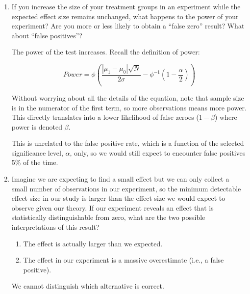\documentclass[a4paper,12pt]{exam}
\begin{document}
\begin{enumerate}
\begin{enumerate}
	\item If you increase the size of your treatment groups in an experiment while the expected effect size remains unchanged, what happens to the power of your experiment? Are you more or less likely to obtain a ``false zero'' result? What about ``false positives''?
	
	\begin{solution}
	
	The power of the test increases. Recall the definition of power:
	
	\begin{equation}
	Power = \phi\left( \frac{|\mu_1 - \mu_0|\sqrt{N}}{2\sigma} - \phi^{-1}\left( 1 - \frac{\alpha}{2} \right) \right)
	\end{equation}
	
	Without worrying about all the details of the equation, note that sample size is in the numerator of the first term, so more observations means more power. This directly translates into a lower likelihood of false zeroes ($1-\beta$) where power is denoted $\beta$.
	
	This is unrelated to the false positive rate, which is a function of the selected significance level, $\alpha$, only, so we would still expect to encounter false positives 5\% of the time.
	
	\end{solution}
	
	\item Imagine we are expecting to find a small effect but we can only collect a small number of observations in our experiment, so the minimum detectable effect size in our study is larger than the effect size we would expect to observe given our theory. If our experiment reveals an effect that is statistically distinguishable from zero, what are the two possible interpretations of this result?
	
	\begin{solution}
	
	\begin{enumerate}
	\item The effect is actually larger than we expected.
	\item The effect in our experiment is a massive overestimate (i.e., a false positive).
	\end{enumerate}
	
	We cannot distinguish which alternative is correct.
	
	\end{solution}
	

\end{enumerate}
\end{enumerate}
\end{document}
